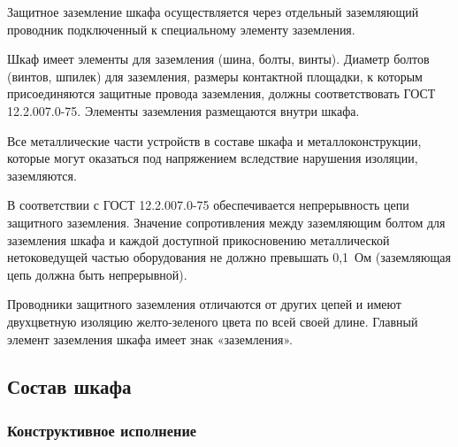 \begin{enumsubsub}
\item Защитное заземление шкафа осуществляется через отдельный заземляющий проводник подключенный к специальному элементу заземления.
\item Шкаф имеет элементы для заземления (шина, болты, винты). Диаметр болтов (винтов, шпилек) для заземления, размеры контактной площадки, к которым присоединяются защитные провода заземления, должны соответствовать ГОСТ 12.2.007.0-75. Элементы заземления размещаются внутри шкафа.
\item Все металлические части устройств в составе шкафа и металлоконструкции, которые могут оказаться под напряжением вследствие нарушения изоляции, заземляются.
\item В соответствии с ГОСТ 12.2.007.0-75 обеспечивается непрерывность цепи защитного заземления. Значение сопротивления между заземляющим болтом для заземления шкафа и каждой доступной прикосновению металлической нетоковедущей частью оборудования не должно превышать 0,1~Ом (заземляющая цепь должна быть непрерывной).
\item Проводники защитного заземления отличаются от других цепей и имеют двухцветную изоляцию желто-зеленого цвета по всей своей длине. Главный элемент заземления шкафа имеет знак «заземления».
\end{enumsubsub}

{\color{unimain}\subsection{Состав шкафа}}

\subsubsection{Конструктивное исполнение}

